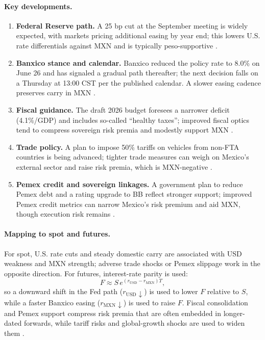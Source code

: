 \documentclass[10pt,a4paper]{article} %
\begin{document}
\paragraph{Key developments.}
\begin{enumerate}
  \item \textbf{Federal Reserve path.} A 25 bp cut at the September meeting is widely expected, with markets pricing additional easing by year end; this lowers U.S. rate differentials against MXN and is typically peso-supportive \citep{reuters_fed_poll_2025,reuters_cenbank_graphic_2025}. 
  \item \textbf{Banxico stance and calendar.} Banxico reduced the policy rate to 8.0\% on June 26 and has signaled a gradual path thereafter; the next decision falls on a Thursday at 13:00 CST per the published calendar. A slower easing cadence preserves carry in MXN \citep{reuters_banxico_jun26_2025,banxico_calendar_2025}. 
  \item \textbf{Fiscal guidance.} The draft 2026 budget foresees a narrower deficit (4.1\%/GDP) and includes so-called ``healthy taxes''; improved fiscal optics tend to compress sovereign risk premia and modestly support MXN \citep{reuters_budget_2026_2025}. 
  \item \textbf{Trade policy.} A plan to impose 50\% tariffs on vehicles from non-FTA countries is being advanced; tighter trade measures can weigh on Mexico’s external sector and raise risk premia, which is MXN-negative \citep{reuters_tariffs_autos_2025}. 
  \item \textbf{Pemex credit and sovereign linkages.} A government plan to reduce Pemex debt and a rating upgrade to BB reflect stronger support; improved Pemex credit metrics can narrow Mexico’s risk premium and aid MXN, though execution risk remains \citep{reuters_pemex_plan_2025,reuters_fitch_pemex_2025}. 
\end{enumerate}

\paragraph{Mapping to spot and futures.}
For spot, U.S. rate cuts and steady domestic carry are associated with USD weakness and MXN strength; adverse trade shocks or Pemex slippage work in the opposite direction. For futures, interest-rate parity is used:
\[
F \approx S \, e^{(r_{\mathrm{USD}} - r_{\mathrm{MXN}})T},
\]
so a downward shift in the Fed path (\(r_{\mathrm{USD}}\downarrow\)) is used to lower \(F\) relative to \(S\), while a faster Banxico easing (\(r_{\mathrm{MXN}}\downarrow\)) is used to raise \(F\). Fiscal consolidation and Pemex support compress risk premia that are often embedded in longer-dated forwards, while tariff risks and global-growth shocks are used to widen them \citep{cme_mxn_quotes,cme_fx_overview}.
\end{document}
